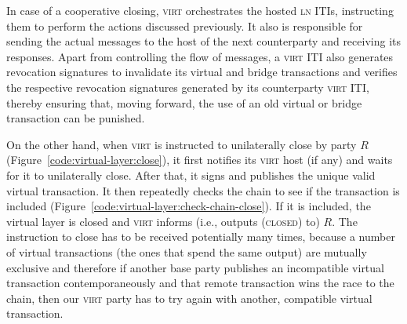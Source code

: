   In case of a cooperative closing, \textsc{virt} orchestrates the hosted
  \textsc{ln} ITIs, instructing them to perform the actions discussed
  previously. It also is responsible for sending the actual messages to the host
  of the next counterparty and receiving its responses. Apart from controlling
  the flow of messages, a \textsc{virt} ITI also generates revocation signatures
  to invalidate its virtual and bridge transactions and verifies the respective
  revocation signatures generated by its counterparty \textsc{virt} ITI, thereby
  ensuring that, moving forward, the use of an old virtual or bridge transaction
  can be punished.

  On the other hand, when \textsc{virt} is instructed to unilaterally close by
  party $R$
  (Figure~\ref{code:virtual-layer:close}), it first notifies its \textsc{virt}
  host (if any) and waits for it to unilaterally close. After that, it signs and
  publishes the unique valid virtual transaction. It then repeatedly checks the
  chain to see if the transaction is included
  (Figure~\ref{code:virtual-layer:check-chain-close}). If it is included, the
  virtual layer is closed and \textsc{virt} informs (i.e., outputs
  (\textsc{closed}) to) $R$. The instruction to close has to be received
  potentially many times, because a number of virtual transactions (the ones
  that spend the same output) are mutually exclusive and therefore if another
  base party publishes an incompatible virtual transaction contemporaneously and
  that remote transaction wins the race to the chain, then our \textsc{virt}
  party has to try again with another, compatible virtual transaction.
